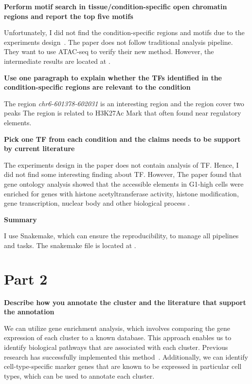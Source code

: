 \documentclass{article}
\begin{document}
\textbf{Perform motif search in tissue/condition-specific open chromatin regions and report the top five motifs}

Unfortunately, I did not find the condition-specific regions and motifs due to the experiments design~\citep{Chen2016}.
The paper does not follow traditional analysis pipeline.
They want to use ATAC-seq to verify their new method.
However, the intermediate results are located at .


\textbf{Use one paragraph to explain whether the TFs identified in the condition-specific regions are relevant to the condition}

The region \textit{chr6-601378-602031} is an interesting region and the region cover two peaks
The region is related to H3K27Ac Mark that often found near regulatory elements.


\textbf{Pick one TF from each condition and the claims needs to be support by current literature}

The experiments design in the paper does not contain analysis of TF.
Hence, I did not find some interesting finding about TF.
However, The paper found that gene ontology analysis showed that the accessible elements in G1-high cells were enriched for genes with histone acetyltransferase activity, histone modification, gene transcription, nuclear body and other biological process \citep{Chen2016}.

\textbf{Summary}

I use Snakemake, which can ensure the reproducibility, to manage all pipelines and tasks.
The snakemake file is located at .


\section{Part 2}

\textbf{Describe how you annotate the cluster and the literature that support the annotation}

We can utilize gene enrichment analysis, which involves comparing the gene expression of each cluster to a known database.
This approach enables us to identify biological pathways that are associated with each cluster.
Previous research has successfully implemented this method~\citep{Tirosh2016}.
Additionally, we can identify cell-type-specific marker genes that are known to be expressed in particular cell types, which can be used to annotate each cluster.
\end{document}
